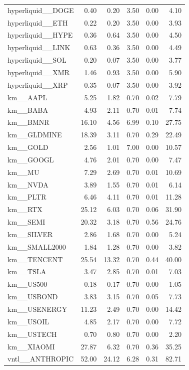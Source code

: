 \begin{table}[h]
\begin{tabular}{lrrrrr}
hyperliquid__DOGE & 0.40 & 0.20 & 3.50 & 0.00 & 4.10 \\
hyperliquid__ETH & 0.22 & 0.20 & 3.50 & 0.00 & 3.93 \\
hyperliquid__HYPE & 0.36 & 0.64 & 3.50 & 0.00 & 4.50 \\
hyperliquid__LINK & 0.63 & 0.36 & 3.50 & 0.00 & 4.49 \\
hyperliquid__SOL & 0.20 & 0.07 & 3.50 & 0.00 & 3.77 \\
hyperliquid__XMR & 1.46 & 0.93 & 3.50 & 0.00 & 5.90 \\
hyperliquid__XRP & 0.35 & 0.07 & 3.50 & 0.00 & 3.92 \\
km__AAPL & 5.25 & 1.82 & 0.70 & 0.02 & 7.79 \\
km__BABA & 4.93 & 2.11 & 0.70 & 0.01 & 7.74 \\
km__BMNR & 16.10 & 4.56 & 6.99 & 0.10 & 27.75 \\
km__GLDMINE & 18.39 & 3.11 & 0.70 & 0.29 & 22.49 \\
km__GOLD & 2.56 & 1.01 & 7.00 & 0.00 & 10.57 \\
km__GOOGL & 4.76 & 2.01 & 0.70 & 0.00 & 7.47 \\
km__MU & 7.29 & 2.69 & 0.70 & 0.01 & 10.69 \\
km__NVDA & 3.89 & 1.55 & 0.70 & 0.01 & 6.14 \\
km__PLTR & 6.46 & 4.11 & 0.70 & 0.01 & 11.28 \\
km__RTX & 25.12 & 6.03 & 0.70 & 0.06 & 31.90 \\
km__SEMI & 20.32 & 3.18 & 0.70 & 0.56 & 24.76 \\
km__SILVER & 2.86 & 1.68 & 0.70 & 0.00 & 5.24 \\
km__SMALL2000 & 1.84 & 1.28 & 0.70 & 0.00 & 3.82 \\
km__TENCENT & 25.54 & 13.32 & 0.70 & 0.44 & 40.00 \\
km__TSLA & 3.47 & 2.85 & 0.70 & 0.01 & 7.03 \\
km__US500 & 0.18 & 0.17 & 0.70 & 0.00 & 1.05 \\
km__USBOND & 3.83 & 3.15 & 0.70 & 0.05 & 7.73 \\
km__USENERGY & 11.23 & 2.49 & 0.70 & 0.00 & 14.42 \\
km__USOIL & 4.85 & 2.17 & 0.70 & 0.00 & 7.72 \\
km__USTECH & 0.70 & 0.80 & 0.70 & 0.00 & 2.20 \\
km__XIAOMI & 27.87 & 6.32 & 0.70 & 0.36 & 35.25 \\
vntl__ANTHROPIC & 52.00 & 24.12 & 6.28 & 0.31 & 82.71 \\

\end{tabular}
\end{table}
